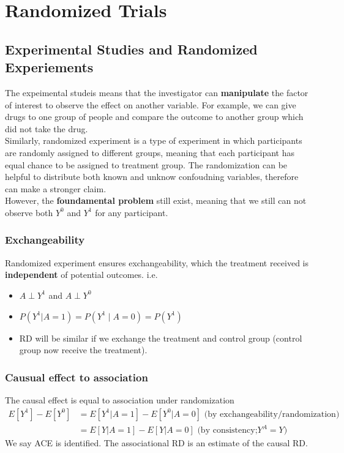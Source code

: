 \section{Randomized Trials}
\subsection{Experimental Studies and Randomized Experiements}
The expeimental studeis means that the investigator can \textbf{manipulate} the factor of interest to observe the effect on another variable. For example, we can give drugs to one group of people and compare the outcome to another group which did not take the drug.\\

Similarly, randomized experiment is a type of experiment in which participants are randomly assigned to different groups, meaning that each participant has equal chance to be assigned to treatment group. The randomization can be helpful to distribute both known and unknow confoudning variables, therefore can make a stronger claim.\\

However, the \textbf{foundamental problem} still exist, meaning that we still can not observe both $Y^0$ and $Y^1$ for any participant.
\subsubsection*{Exchangeability}
Randomized experiment ensures exchangeability, which the treatment received is \textbf{independent} of potential outcomes. i.e.
\begin{itemize}
    \item $A \perp Y^1$ and $A \perp Y^0$
    \item $P\left(Y^1|A=1\right)=P\left(Y^1 \mid A=0\right)=P\left(Y^1\right)$
    \item RD will be similar if we exchange the treatment and control group (control group now receive the treatment).
\end{itemize}
\subsubsection*{Causual effect to association}
The causal effect is equal to association under randomization
\begin{align*}
E\left[Y^1\right]-E\left[Y^0\right] & =E\left[Y^1| A=1\right]-E\left[Y^0|A=0\right] \text { (by exchangeability/randomization) } \\
& =E[Y|A=1]-E[Y|A=0] \text { (by consistency;$Y^A=Y$)}
\end{align*}
We say ACE is identified. The associational RD is an estimate of the causal RD.
